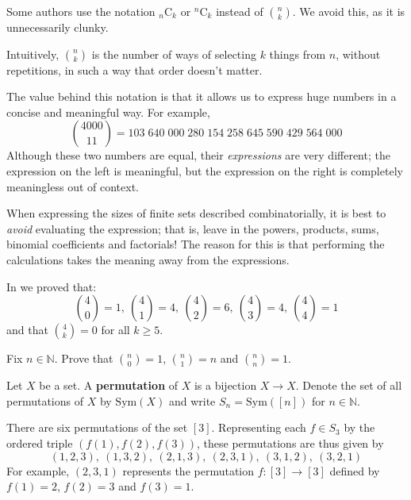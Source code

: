 Some authors use the notation ${}_n\mathrm{C}_k$ or ${}^n\mathrm{C}_k$ instead of $\binom{n}{k}$. We avoid this, as it is unnecessarily clunky.

Intuitively, $\binom{n}{k}$ is the number of ways of selecting $k$ things from $n$, without repetitions, in such a way that order doesn't matter.

The value behind this notation is that it allows us to express huge numbers in a concise and meaningful way. For example,
\[ \binom{4000}{11} = 103\;640\;000\;280\;154\;258\;645\;590\;429\;564\;000 \]
Although these two numbers are equal, their \textit{expressions} are very different; the expression on the left is meaningful, but the expression on the right is completely meaningless out of context.

\begin{writingtip}
When expressing the sizes of finite sets described combinatorially, it is best to \textit{avoid} evaluating the expression; that is, leave in the powers, products, sums, binomial coefficients and factorials! The reason for this is that performing the calculations takes the meaning away from the expressions.
\end{writingtip}

\begin{example} \label{exBinomCalc4}
In  we proved that:
\[ \binom{4}{0} = 1,\ \binom{4}{1} = 4,\ \binom{4}{2} = 6,\ \binom{4}{3} = 4,\ \binom{4}{4} = 1 \]
and that $\binom{4}{k} = 0$ for all $k \ge 5$.
\end{example}

\begin{exercise}
Fix $n \in \mathbb{N}$. Prove that $\binom{n}{0} = 1$, $\binom{n}{1} = n$ and $\binom{n}{n} = 1$.
\end{exercise}

\begin{definition}
\label{defPermutationPreliminary}
Let $X$ be a set. A \textbf{permutation} of $X$ is a bijection $X \to X$. Denote the set of all permutations of $X$ by $\mathrm{Sym}(X)$  and write $S_n = \mathrm{Sym}([n])$ for $n \in \mathbb{N}$.
\end{definition}

\begin{example}
\label{exPermutationsOfBracket3}
There are six permutations of the set $[3]$. Representing each $f \in S_3$ by the ordered triple $(f(1),f(2),f(3))$, these permutations are thus given by
\[ (1,2,3),\ (1,3,2),\ (2,1,3),\ (2,3,1),\ (3,1,2),\ (3,2,1) \]
For example, $(2,3,1)$ represents the permutation $f : [3] \to [3]$ defined by $f(1)=2$, $f(2)=3$ and $f(3)=1$.
\end{example}

